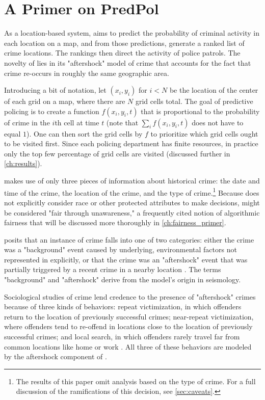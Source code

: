 \chapter{A Primer on PredPol}\label{ch:predpol_primer}

As a location-based system, \pp aims to predict the probability of criminal activity in each location on a map, and from those predictions, generate a ranked list of crime locations. The rankings then direct the activity of police patrols. The novelty of \pp lies in its "aftershock" model of crime that accounts for the fact that crime re-occurs in roughly the same geographic area.

Introducing a bit of notation, let $(x_i, y_i)$ for $i < N$ be the location of the center of each grid on a map, where there are $N$ grid cells total. The goal of predictive policing is to create a function $f(x_i, y_i, t)$ that is proportional to the probability of crime in the $i$th cell at time $t$ (note that $\sum_i f(x_i, y_i, t)$ does not have to equal $1$). One can then sort the grid cells by $f$ to prioritize which grid cells ought to be visited first. Since each policing department has finite resources, in practice only the top few percentage of grid cells are visited (discussed further in \autoref{ch:results}).

\pp makes use of only three pieces of information about historical crime: the date and time of the crime, the location of the crime, and the type of crime.\footnote{The results of this paper omit analysis based on the type of crime. For a full discussion of the ramifications of this decision, see \autoref{sec:caveats}.} Because \pp does not explicitly consider race or other protected attributes to make decisions, \pp might be considered "fair through unawareness," a frequently cited notion of algorithmic fairness that will be discussed more thoroughly in \autoref{ch:fairness_primer}.

\pp posits that an instance of crime falls into one of two categories: either the crime was a "background" event caused by underlying, environmental factors not represented in \pp explicitly, or that the crime was an "aftershock" event that was partially triggered by a recent crime in a nearby location \citep{mohler_self-exciting_2011,mohler_marked_2014}. The terms "background" and "aftershock" derive from the model's origin in seismology.

Sociological studies of crime lend credence to the presence of "aftershock" crimes because of three kinds of behaviors: repeat victimization, in which offenders return to the location of previously successful crimes; near-repeat victimization, where offenders tend to re-offend in locations close to the location of previously successful crimes; and local search, in which offenders rarely travel far from common locations like home or work \citep{mohler_self-exciting_2011}. All three of these behaviors are modeled by the aftershock component of \pp.

